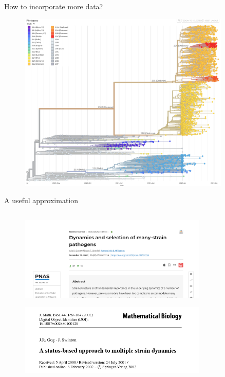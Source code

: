 \documentclass{beamer}
\begin{document}
\begin{frame}{How to incorporate more data?}
    \centering
    \begin{figure}
        \includegraphics[width=0.9\textwidth]{my_figs/phylogeny.png}
    \end{figure}
\end{frame}
\begin{frame}{A useful approximation}
    \begin{columns}
\begin{column}{\textwidth}
    \begin{figure}
        \includegraphics[width=0.8\textwidth]{standalone/gog_paper.png}
    \end{figure}
    \begin{figure}
        \includegraphics[width=0.8\textwidth]{standalone/gog_paper_2.png}
    \end{figure}
\end{column}
\end{columns}
\end{frame}
\end{document}
